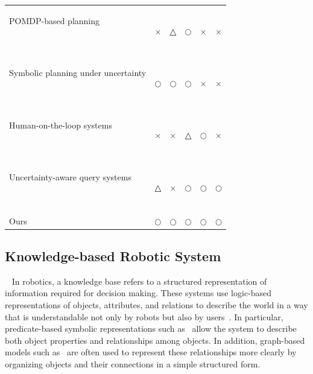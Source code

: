 \begin{table}[t]
{\begin{tabular}{p{5cm}ccccc}
POMDP-based planning

~\cite{somani2013despot,bai2015intention,cramer2021probabilistic,bravo2019use,lauri2016exploration,kim2021plgrim,vanegas2016uav,xiao2019objectsearch,pajarinen2022composition}
& $\times$
& △
& $\bigcirc$
& $\times$
& $\times$ \\


Symbolic planning under uncertainty

~\cite{li2026uncertainty,sanner2010symbolic,zhang2015corpp,serrano2021knowledge,
tang2025tru}
& $\bigcirc$
& $\bigcirc$
& $\bigcirc$
& $\times$
& $\times$ \\

Human-on-the-loop systems

~\cite{scharre2015introduction,
nahavandi2017trusted,
kelly2019hg,mandlekar2020human}
& $\times$
& $\times$
& △
& $\bigcirc$
& $\times$ \\

Uncertainty-aware query systems

~\cite{ren2023robots,liang2024introspective,
mullen2025lbap}
& △
& $\times$
& $\bigcirc$
& $\bigcirc$
& $\bigcirc$ \\

Ours
& $\bigcirc$
& $\bigcirc$
& $\bigcirc$
& $\bigcirc$
& $\bigcirc$ \\

\bottomrule
\end{tabular}
}
\end{table}



\subsection{Knowledge-based Robotic System}~\label{rel:kb}
In robotics, a knowledge base refers to a structured representation of information required for decision making. These systems use logic-based representations of objects, attributes, and relations to describe the world in a way that is understandable not only by robots but also by users~\cite{brachman2004knowledge, russell1995modern}. In particular, predicate-based symbolic representations such as~\cite{fikes1971strips, aeronautiques1998pddl} allow the system to describe both object properties and relationships among objects. In addition, graph-based models such as~\cite{johnson2015image, armeni20193d} are often used to represent these relationships more clearly by organizing objects and their connections in a simple structured form.


